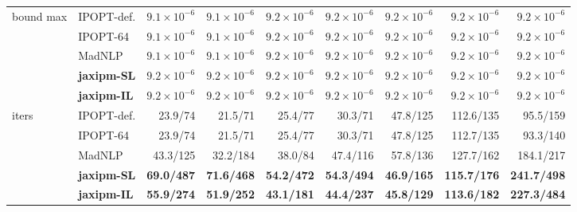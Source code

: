 \begin{table}[p]
{\begin{tabular}{@{}l l r r r r r r r@{}}
\midrule
\multirow{5}{*}{bound max} & IPOPT-def. & $9.1\!\times\!10^{-6}$ & $9.1\!\times\!10^{-6}$ & $9.2\!\times\!10^{-6}$ & $9.2\!\times\!10^{-6}$ & $9.2\!\times\!10^{-6}$ & $9.2\!\times\!10^{-6}$ & $9.2\!\times\!10^{-6}$ \\
 & IPOPT-64 & $9.1\!\times\!10^{-6}$ & $9.1\!\times\!10^{-6}$ & $9.2\!\times\!10^{-6}$ & $9.2\!\times\!10^{-6}$ & $9.2\!\times\!10^{-6}$ & $9.2\!\times\!10^{-6}$ & $9.2\!\times\!10^{-6}$ \\
 & MadNLP & $9.1\!\times\!10^{-6}$ & $9.1\!\times\!10^{-6}$ & $9.2\!\times\!10^{-6}$ & $9.2\!\times\!10^{-6}$ & $9.2\!\times\!10^{-6}$ & $9.2\!\times\!10^{-6}$ & $9.2\!\times\!10^{-6}$ \\
 & \textbf{jaxipm-SL} & {\boldmath$9.2\!\times\!10^{-6}$} & {\boldmath$9.2\!\times\!10^{-6}$} & {\boldmath$9.2\!\times\!10^{-6}$} & {\boldmath$9.2\!\times\!10^{-6}$} & {\boldmath$9.2\!\times\!10^{-6}$} & {\boldmath$9.2\!\times\!10^{-6}$} & {\boldmath$9.2\!\times\!10^{-6}$} \\
 & \textbf{jaxipm-IL} & {\boldmath$9.2\!\times\!10^{-6}$} & {\boldmath$9.2\!\times\!10^{-6}$} & {\boldmath$9.2\!\times\!10^{-6}$} & {\boldmath$9.2\!\times\!10^{-6}$} & {\boldmath$9.2\!\times\!10^{-6}$} & {\boldmath$9.2\!\times\!10^{-6}$} & {\boldmath$9.2\!\times\!10^{-6}$} \\
\midrule
\multirow{5}{*}{iters} & IPOPT-def. & 23.9/74 & 21.5/71 & 25.4/77 & 30.3/71 & 47.8/125 & 112.6/135 & 95.5/159 \\
 mean/max & IPOPT-64 & 23.9/74 & 21.5/71 & 25.4/77 & 30.3/71 & 47.8/125 & 112.7/135 & 93.3/140 \\
 & MadNLP & 43.3/125 & 32.2/184 & 38.0/84 & 47.4/116 & 57.8/136 & 127.7/162 & 184.1/217 \\
 & \textbf{jaxipm-SL} & \textbf{69.0/487} & \textbf{71.6/468} & \textbf{54.2/472} & \textbf{54.3/494} & \textbf{46.9/165} & \textbf{115.7/176} & \textbf{241.7/498} \\
 & \textbf{jaxipm-IL} & \textbf{55.9/274} & \textbf{51.9/252} & \textbf{43.1/181} & \textbf{44.4/237} & \textbf{45.8/129} & \textbf{113.6/182} & \textbf{227.3/484} \\
\bottomrule
\end{tabular}}

\end{table}
